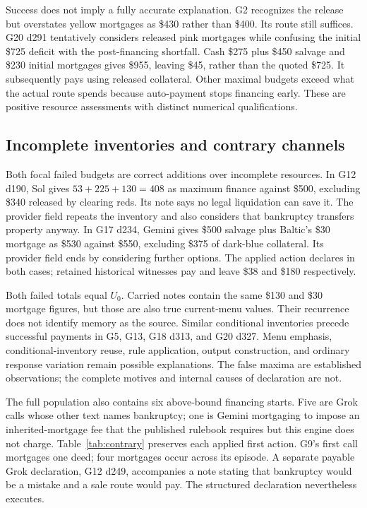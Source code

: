 Success does not imply a fully accurate explanation. G2 recognizes the release but overstates yellow mortgages as \$430 rather than \$400. Its route still suffices. G20 d291 tentatively considers released pink mortgages while confusing the initial \$725 deficit with the post-financing shortfall. Cash \$275 plus \$450 salvage and \$230 initial mortgages gives \$955, leaving \$45, rather than the quoted \$725. It subsequently pays using released collateral. Other maximal budgets exceed what the actual route spends because auto-payment stops financing early. These are positive resource assessments with distinct numerical qualifications.

\subsection{Incomplete inventories and contrary channels}

Both focal failed budgets are correct additions over incomplete resources. In G12 d190, Sol gives $53+225+130=408$ as maximum finance against \$500, excluding \$340 released by clearing reds. Its note says no legal liquidation can save it. The provider field repeats the inventory and also considers that bankruptcy transfers property anyway. In G17 d234, Gemini gives \$500 salvage plus Baltic's \$30 mortgage as \$530 against \$550, excluding \$375 of dark-blue collateral. Its provider field ends by considering further options. The applied action declares in both cases; retained historical witnesses pay and leave \$38 and \$180 respectively.

Both failed totals equal $U_0$. Carried notes contain the same \$130 and \$30 mortgage figures, but those are also true current-menu values. Their recurrence does not identify memory as the source. Similar conditional inventories precede successful payments in G5, G13, G18 d313, and G20 d327. Menu emphasis, conditional-inventory reuse, rule application, output construction, and ordinary response variation remain possible explanations. The false maxima are established observations; the complete motives and internal causes of declaration are not.

The full population also contains six above-bound financing starts. Five are Grok calls whose other text names bankruptcy; one is Gemini mortgaging to impose an inherited-mortgage fee that the published rulebook requires but this engine does not charge. Table~\ref{tab:contrary} preserves each applied first action. G9's first call mortgages one deed; four mortgages occur across its episode. A separate payable Grok declaration, G12 d249, accompanies a note stating that bankruptcy would be a mistake and a sale route would pay. The structured declaration nevertheless executes.

